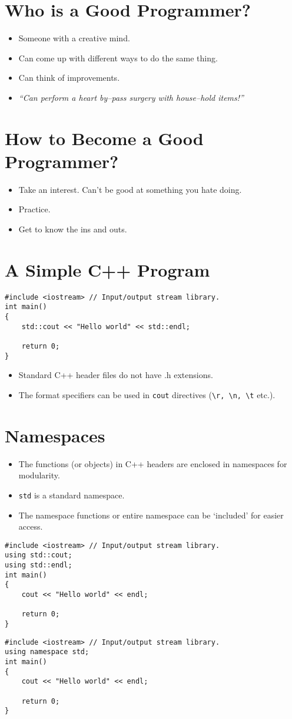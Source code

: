 \documentclass[12pt,a4paper]{article}
\begin{document}
\section{Who is a Good Programmer?}
\begin{itemize}
\item Someone with a creative mind.
\item Can come up with different ways to do the same thing.
\item Can think of improvements.
\item \textit{``Can perform a heart by--pass surgery with house--hold items!''}
\end{itemize}
\section{How to Become a Good Programmer?}
\begin{itemize}
\item Take an interest. Can't be good at something you hate doing.
\item Practice.
\item Get to know the ins and outs.
\end{itemize}
\section{A Simple C++ Program}
\begin{lstlisting}[caption={A Basic C++ Program}]
#include <iostream> // Input/output stream library.
int main()
{
	std::cout << "Hello world" << std::endl;
	
	return 0;
}
\end{lstlisting}
\begin{itemize}
\item Standard C++ header files do not have .h extensions.
\item The format specifiers can be used in \verb|cout| directives (\verb|\r, \n, \t| etc.).
\end{itemize}
\section{Namespaces}
\begin{itemize}
\item The functions (or objects) in C++ headers are enclosed in namespaces for modularity.
\item \texttt{std} is a standard namespace.
\item The namespace functions or entire namespace can be `included' for easier access.
\end{itemize}
\begin{lstlisting}[caption={The `using' Directive}]
#include <iostream> // Input/output stream library.
using std::cout;
using std::endl;
int main()
{
	cout << "Hello world" << endl;
	
	return 0;
}
\end{lstlisting}
\begin{lstlisting}[caption={Including a Namespace}]
#include <iostream> // Input/output stream library.
using namespace std;
int main()
{
	cout << "Hello world" << endl;
	
	return 0;
}
\end{lstlisting}
\end{document}
